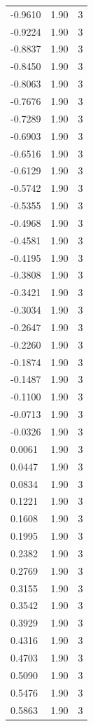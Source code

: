 \begin{longtable}{lrr}
  -0.9610 & 1.90 & 3 \\
  -0.9224 & 1.90 & 3 \\
  -0.8837 & 1.90 & 3 \\
  -0.8450 & 1.90 & 3 \\
  -0.8063 & 1.90 & 3 \\
  -0.7676 & 1.90 & 3 \\
  -0.7289 & 1.90 & 3 \\
  -0.6903 & 1.90 & 3 \\
  -0.6516 & 1.90 & 3 \\
  -0.6129 & 1.90 & 3 \\
  -0.5742 & 1.90 & 3 \\
  -0.5355 & 1.90 & 3 \\
  -0.4968 & 1.90 & 3 \\
  -0.4581 & 1.90 & 3 \\
  -0.4195 & 1.90 & 3 \\
  -0.3808 & 1.90 & 3 \\
  -0.3421 & 1.90 & 3 \\
  -0.3034 & 1.90 & 3 \\
  -0.2647 & 1.90 & 3 \\
  -0.2260 & 1.90 & 3 \\
  -0.1874 & 1.90 & 3 \\
  -0.1487 & 1.90 & 3 \\
  -0.1100 & 1.90 & 3 \\
  -0.0713 & 1.90 & 3 \\
  -0.0326 & 1.90 & 3 \\
  0.0061 & 1.90 & 3 \\
  0.0447 & 1.90 & 3 \\
  0.0834 & 1.90 & 3 \\
  0.1221 & 1.90 & 3 \\
  0.1608 & 1.90 & 3 \\
  0.1995 & 1.90 & 3 \\
  0.2382 & 1.90 & 3 \\
  0.2769 & 1.90 & 3 \\
  0.3155 & 1.90 & 3 \\
  0.3542 & 1.90 & 3 \\
  0.3929 & 1.90 & 3 \\
  0.4316 & 1.90 & 3 \\
  0.4703 & 1.90 & 3 \\
  0.5090 & 1.90 & 3 \\
  0.5476 & 1.90 & 3 \\
  0.5863 & 1.90 & 3 \\

\end{longtable}
